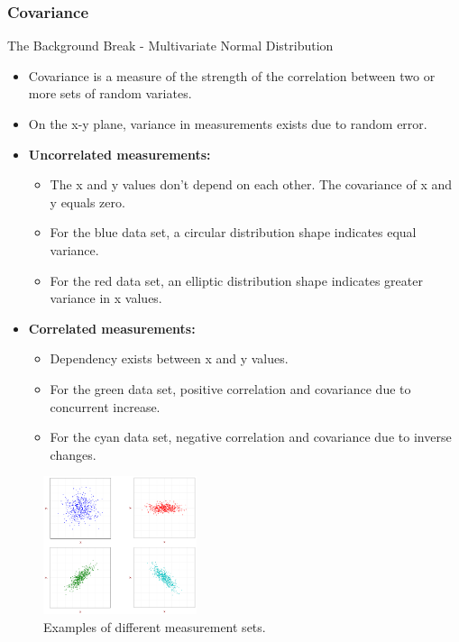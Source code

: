 \subsubsection{Covariance}
\begin{frame}{The Background Break - Multivariate Normal Distribution}
    \begin{itemize}
        \item Covariance is a measure of the strength of the correlation between two or more sets of random variates.
        \item On the x-y plane, variance in measurements exists due to random error.
    \end{itemize}
        \begin{itemize}
            \item \textbf{Uncorrelated measurements:}
            \begin{itemize}
                \item The x and y values don't depend on each other. The covariance of x and y equals zero.
                \item For the blue data set, a circular distribution shape indicates equal variance.
                \item For the red data set, an elliptic distribution shape indicates greater variance in x values.
            \end{itemize}
            \item \textbf{Correlated measurements:}
            \begin{itemize}
                \item Dependency exists between x and y values.
                \item For the green data set, positive correlation and covariance due to concurrent increase.
                \item For the cyan data set, negative correlation and covariance due to inverse changes.
            \end{itemize}
        \end{itemize}
    \begin{figure}
        \centering
    \includegraphics[width=0.4\textwidth]{Figures/Background2/CovarianceIllustration.png}
        \caption{Examples of different measurement sets.}
    \end{figure}

\end{frame}
